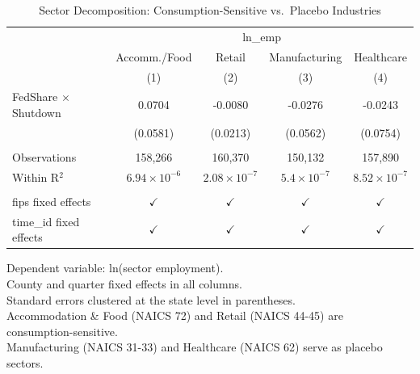 
\begin{table}[htbp]
   \caption{\label{tab:sectors} Sector Decomposition: Consumption-Sensitive vs.\ Placebo Industries}
   \bigskip
   \centering
   \begin{tabular}{lcccc}
      \toprule
       & \multicolumn{4}{c}{ln\_emp}\\
                                  & Accomm./Food          & Retail                & Manufacturing        & Healthcare \\   
                                  & (1)                   & (2)                   & (3)                  & (4)\\  
      \midrule 
      FedShare $\times$ Shutdown  & 0.0704                & -0.0080               & -0.0276              & -0.0243\\   
                                  & (0.0581)              & (0.0213)              & (0.0562)             & (0.0754)\\   
       \\
      Observations                & 158,266               & 160,370               & 150,132              & 157,890\\  
      Within R$^2$                & $6.94\times 10^{-6}$  & $2.08\times 10^{-7}$  & $5.4\times 10^{-7}$  & $8.52\times 10^{-7}$\\   
       \\
      fips fixed effects          & $\checkmark$          & $\checkmark$          & $\checkmark$         & $\checkmark$\\   
      time\_id fixed effects      & $\checkmark$          & $\checkmark$          & $\checkmark$         & $\checkmark$\\   
      \bottomrule
   \end{tabular}
   
   \par \raggedright 
   Dependent variable: ln(sector employment).\\
   County and quarter fixed effects in all columns.\\
   Standard errors clustered at the state level in parentheses.\\
   Accommodation \& Food (NAICS 72) and Retail (NAICS 44-45) are consumption-sensitive.\\
   Manufacturing (NAICS 31-33) and Healthcare (NAICS 62) serve as placebo sectors.
\end{table}


